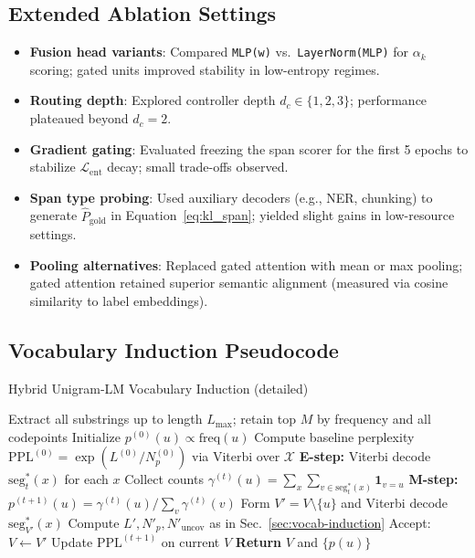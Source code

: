 \subsection{Extended Ablation Settings}
\label{sec:ablation-settings}

\begin{itemize}[leftmargin=1.5em]
	\item \textbf{Fusion head variants}: Compared \texttt{MLP(w)} vs.\ \texttt{LayerNorm(MLP)} for $\alpha_k$ scoring; gated units improved stability in low-entropy regimes.
	\item \textbf{Routing depth}: Explored controller depth $d_c \in \{1,2,3\}$; performance plateaued beyond $d_c=2$.
	\item \textbf{Gradient gating}: Evaluated freezing the span scorer for the first 5 epochs to stabilize $\mathcal{L}_{\mathrm{ent}}$ decay; small trade-offs observed.
	\item \textbf{Span type probing}: Used auxiliary decoders (e.g., NER, chunking) to generate $\hat{P}_{\mathrm{gold}}$ in Equation~\eqref{eq:kl_span}; yielded slight gains in low-resource settings.
	\item \textbf{Pooling alternatives}: Replaced gated attention with mean or max pooling; gated attention retained superior semantic alignment (measured via cosine similarity to label embeddings).
\end{itemize}

\subsection{Vocabulary Induction Pseudocode}
\label{sec:induction-pseudocode}

\begin{algorithm}[H]
	\caption{Hybrid Unigram‐LM Vocabulary Induction (detailed)}
	\label{alg:induction-detailed}
	\begin{algorithmic}[1]
		\STATE Extract all substrings up to length $L_{\max}$; retain top $M$ by frequency and all codepoints
		\STATE Initialize $p^{(0)}(u) \propto \mathrm{freq}(u)$
		\STATE Compute baseline perplexity $\mathrm{PPL}^{(0)} = \exp(L^{(0)}/N_p^{(0)})$ via Viterbi over $\mathcal X$
		\STATE \textbf{E-step:} Viterbi decode $\mathrm{seg}^*_t(x)$ for each $x$
		\STATE Collect counts $\gamma^{(t)}(u)\!=\!\sum_x\sum_{v\in\mathrm{seg}^*_t(x)}\mathbf1_{v=u}$
		\STATE \textbf{M-step:} $p^{(t+1)}(u)\!=\!\gamma^{(t)}(u)\big/\sum_v\gamma^{(t)}(v)$
		\STATE Form $V' = V\setminus\{u\}$ and Viterbi decode $\mathrm{seg}^*_{V'}(x)$
		\STATE Compute $L', N'_p, N'_{\mathrm{uncov}}$ as in Sec.~\ref{sec:vocab-induction}
		\STATE Accept: $V\leftarrow V'$
		\ENDIF
		\ENDFOR
		\STATE Update $\mathrm{PPL}^{(t+1)}$ on current $V$
		\ENDFOR
		\STATE \textbf{Return} $V$ and $\{p(u)\}$
	\end{algorithmic}
\end{algorithm}

